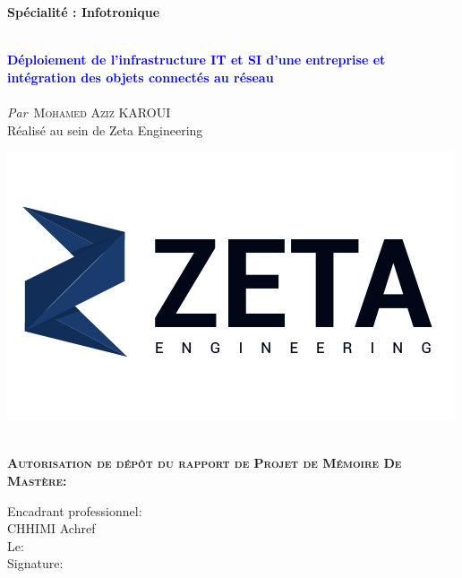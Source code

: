 \begin{titlepage}

\textbf{Spécialité : Infotronique}

\vskip1cm%


\HRule \\[0.4cm]
\textcolor{blue}{ \LARGE \bfseries Déploiement de l'infrastructure IT et SI d'une entreprise et intégration des objets connectés au réseau}\\[0.4cm] %
\HRule \\[1cm]


\textit{Par}\
\textsc{\large Mohamed Aziz KAROUI}\\[0.5cm] %


{Réalisé au sein de Zeta Engineering}\\
\smallskip

\includegraphics[width=0.4\columnwidth]{Images/logo-zeta.png}\

 

\begin{flushleft}
\textbf{\textsc{Autorisation de dépôt du rapport de Projet de Mémoire De Mastère:}}\\[0.5cm] %
\vskip0.5cm
\begin{minipage}[c]{0.4\columnwidth}
Encadrant professionnel: \\ CHHIMI Achref \\

Le:\\

Signature:\\


\end{minipage}
\end{flushleft}
\end{titlepage}

